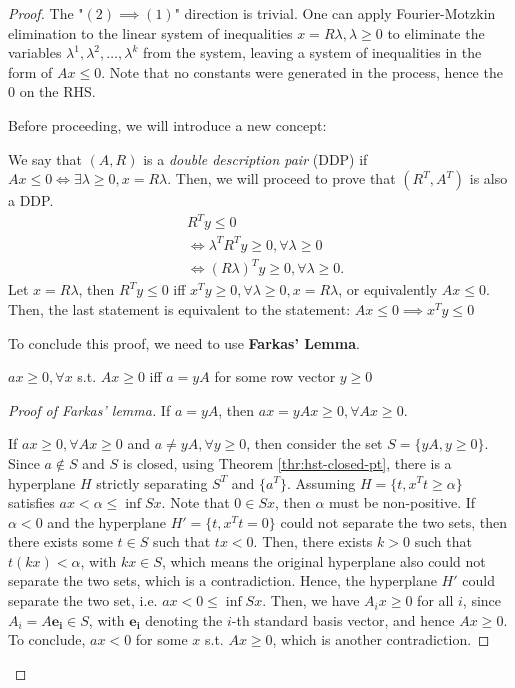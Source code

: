 \begin{proof}
  The "\( (2) \implies (1) \)" direction is trivial. One can apply
  Fourier-Motzkin elimination to the linear system of inequalities \( x =
  R\lambda, \lambda \ge 0 \) to eliminate the variables \( \lambda^{1},
  \lambda^{2}, \ldots , \lambda^{k} \) from the system, leaving a system of
  inequalities in the form of \( Ax \le 0 \). Note that no constants were
  generated in the process, hence the \( 0 \) on the RHS.

  Before proceeding, we will introduce a new concept:

  We say that \( (A, R) \) is a \textit{double description pair} (DDP) if
  \( Ax \le  0 \iff \exists \lambda \ge 0, x = R\lambda  \). Then, we will
  proceed to prove that \( (R^{T}, A^{T}) \) is also a DDP.
  \begin{align*}
    &R^{T}y \le 0\\
    &\iff \lambda^{T} R^{T} y \ge 0, \forall  \lambda \ge 0\\
    &\iff (R\lambda)^{T} y \ge 0, \forall  \lambda \ge 0
  .\end{align*}
  Let \( x = R\lambda \), then \( R^{T}y \le 0 \) iff \( x^{T}y \ge 0, \forall
  \lambda \ge 0, x = R\lambda \), or equivalently \( Ax \le  0 \). Then, the
  last statement is equivalent to the statement: \( Ax \le  0 \implies x^{T}y \le  0 \)

  To conclude this proof, we need to use \textbf{Farkas' Lemma}.

  \begin{lemma}
  \label{farkas}
    \( ax \ge  0, \forall  x \) s.t. \( Ax \ge  0 \) iff \( a = yA \) for some
    row vector \( y \ge  0 \)
  \end{lemma}

  \begin{proof}[Proof of Farkas' lemma]
    If \( a = yA \), then \( ax = yAx \ge  0, \forall  Ax \ge 0 \).

    If \( ax \ge  0, \forall Ax \ge 0 \) and \( a \neq  yA, \forall  y\ge 0 \),
    then consider the set \( S = \{yA, y \ge 0\}   \). Since \( a \notin S \)
    and \( S \) is closed, using Theorem \ref{thr:hst-closed-pt}, there is a
    hyperplane \( H \) strictly separating \( S^{T} \) and \( \{ a^{T}\}   \).
    Assuming \( H = \{t, x^{T}t \ge  \alpha\}   \) satisfies \( ax  <  \alpha
    \le   \inf Sx \). Note that \( 0 \in Sx \), then \( \alpha \) must be
    non-positive. If \( \alpha < 0 \) and the hyperplane \( H' = \{ t, x^{T}t =
    0\}   \) could not separate the two sets, then there exists some \( t \in S
    \) such that \( tx < 0 \). Then, there exists \( k > 0 \) such that \( t(kx)
    < \alpha\), with \( kx \in S \), which means the original hyperplane also could
    not separate the two sets, which is a contradiction. Hence, the hyperplane
    \( H' \) could separate the two set, i.e. \( ax < 0 \le \inf Sx \). Then,
    we have \( A_{i}x \ge  0 \) for all \( i \), since \( A_{i} =
    A\mathbf{e_{i}} \in S \), with \( \mathbf{e_{i}} \) denoting the \( i \)-th
    standard basis vector, and hence \( Ax \ge 0 \). To conclude, \( ax < 0 \)
    for some \( x \) s.t. \( Ax \ge 0 \), which is another contradiction.
  \end{proof}


\end{proof}
